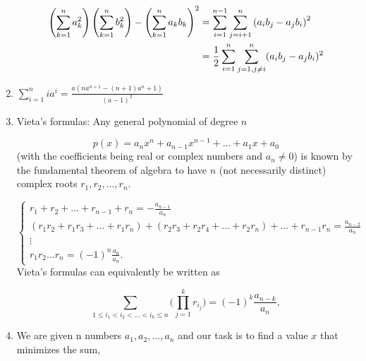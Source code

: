 \begin{enumerate}
                \[\displaystyle \displaystyle {\displaystyle {\begin{aligned}\left(\sum
                \limits_{k=1}^{n}a_{k}^{2}\right)\left(\sum
                \limits_{k=1}^{n}b_{k}^{2}\right)-\left(\sum\limits_{k=1}^{n}a_{k}b_{k}\right)^{2}&=\sum
                \limits_{i=1}^{n-1}\sum \limits_{j=i+1}^{n}\left(a_{i}b_{j}-a_{j}b_{i}\right)^{2}\\&={\frac
                {1}{2}}\sum
                \limits_{i=1}^{n}\sum \limits_{j=1,j\neq i}^{n}(a_{i}b_{j}-a_{j}b_{i})^{2}\end{aligned}}}\]
            
            \item $\displaystyle \sum_{i = 1}^n{ia^i} = \frac{a(n a^{n + 1} - (n + 1) a^n + 1)}{(a - 1)^2}$
            \item 
                Vieta’s formulas:
                    Any general polynomial of degree $n$

                \[\displaystyle p(x) = a_nx^n + a_{n - 1}x^{n - 1} + ... + a_1x + a_0\]
                (with the coefficients being real or complex numbers and $\displaystyle a_n \neq 0$) is known by the
                    fundamental theorem of algebra to have $n$ (not necessarily distinct) complex roots $r_1, r_2,…,
                    r_n$.
                

                \[\begin{cases}
                \text{$r_1 + r_2 + ... + r_{n - 1} + r_n = - \frac{a_{n - 1}}{a_n}$}
                \\
                \text{$\displaystyle (r_1r_2 + r_1r_3 + ... + r_1r_n) + (r_2r_3 + r_2r_4 + ... + r_2r_n) + ... + r_{n -
                1}r_n =
                \frac{a_{n - 2}}{a_n}$}
                \\\vdots\\
                \text{$r_1r_2...r_n = (-1)^n\frac{a_0}{a_n}.$}
                \end{cases}\]
                Vieta’s formulas can equivalently be written as

                \[\displaystyle \sum_{1 \leq i_1 < i_2 < ...<i_k \leq n} \Bigg(\prod_{j = 1}^k{r_{i_j}}\Bigg) =
                (-1)^k\frac{a_{n - k}}{a_n},\]
            
            \item 
                We are given n numbers $\displaystyle a_1,a_2,…,a_n$ and our task is to find a value $\displaystyle
                    x$
                    that
                    minimizes the sum,


\end{enumerate}
